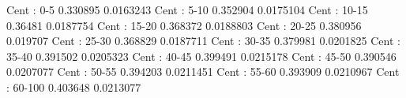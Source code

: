 Cent : 0-5
0.330895 0.0163243
Cent : 5-10
0.352904 0.0175104
Cent : 10-15
0.36481 0.0187754
Cent : 15-20
0.368372 0.0188803
Cent : 20-25
0.380956 0.019707
Cent : 25-30
0.368829 0.0187711
Cent : 30-35
0.379981 0.0201825
Cent : 35-40
0.391502 0.0205323
Cent : 40-45
0.399491 0.0215178
Cent : 45-50
0.390546 0.0207077
Cent : 50-55
0.394203 0.0211451
Cent : 55-60
0.393909 0.0210967
Cent : 60-100
0.403648 0.0213077
